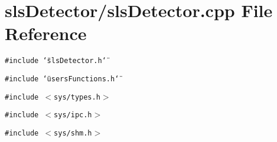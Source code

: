 \section{sls\-Detector/sls\-Detector.cpp File Reference}
\label{slsDetector_8cpp}
{\tt \#include \char`\"{}sls\-Detector.h\char`\"{}}\par
{\tt \#include \char`\"{}users\-Functions.h\char`\"{}}\par
{\tt \#include $<$sys/types.h$>$}\par
{\tt \#include $<$sys/ipc.h$>$}\par
{\tt \#include $<$sys/shm.h$>$}\par

